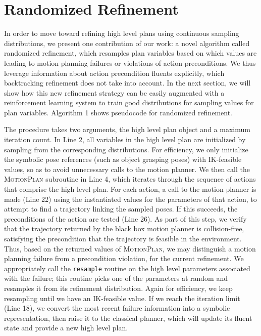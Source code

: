 \section{Randomized Refinement}
In order to move toward refining high level plans using continuous sampling distributions,
we present one contribution of our work: a novel algorithm called randomized refinement, which resamples
plan variables based on which values are leading to motion planning
failures or violations of action preconditions. We thus leverage information
about action precondition fluents explicitly, which backtracking refinement
does not take into account. In the next section, we will show how this new refinement strategy
can be easily augmented with a reinforcement learning system to train good
distributions for sampling values for plan variables. Algorithm 1 shows pseudocode
for randomized refinement.

The procedure takes two arguments, the high level plan object and a maximum
iteration count. In Line 2, all variables in the high level plan are initialized by sampling
from the corresponding distributions. For efficiency, we only initialize the symbolic pose
references (such as object grasping poses) with IK-feasible values, so as to avoid unnecessary calls to the
motion planner. We then call the \textsc{MotionPlan} subroutine in Line 4, which
iterates through the sequence of actions that comprise the high level plan.
For each action, a call to the motion planner is made (Line 22) using the instantiated values
for the parameters of that action, to attempt to find a trajectory
linking the sampled poses. If this succeeds, the preconditions of the action
are tested (Line 26). As part of this step, we verify that the trajectory returned by the
black box motion planner is collision-free, satisfying the precondition
that the trajectory is feasible in the environment. Thus, based
on the returned values of \textsc{MotionPlan}, we may distinguish
a motion planning failure from a precondition violation, for the current
refinement. We appropriately call the \texttt{resample} routine on the high level parameters
associated with the failure; this routine picks one of the parameters at random and
resamples it from its refinement distribution. Again for efficiency, we keep resampling until we
have an IK-feasible value. If we reach the iteration limit (Line 18),
we convert the most recent failure information into a symbolic representation, then raise it
to the classical planner, which will update its fluent state and provide a new
high level plan.

